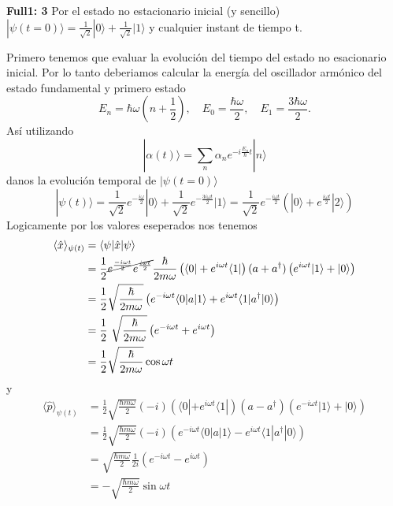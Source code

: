 \begin{ejercicio}
\textbf{Full1: 3} 
Por el estado no estacionario inicial (y sencillo) $|\psi(t=0)\rangle =
\frac{1}{\sqrt{2}} |0\rangle + \frac{1}{\sqrt{2}} | 1 \rangle$ y cualquier
instant de tiempo t. 
\end{ejercicio}
\begin{solucion}
Primero tenemos que evaluar la evolución del tiempo del estado no esacionario
inicial. Por lo tanto deberiamos calcular la energía del oscillador armónico
del estado fundamental y primero estado
\begin{equation*}
	E_n = \hbar \omega (n + \frac{1}{2}), \quad E_0 = \frac{\hbar \omega}{2}
,\quad E_1 = \frac{3 \hbar \omega}{2}.
\end{equation*}
Así utilizando
\begin{equation*}
	|\alpha (t)\rangle = \sum_n \alpha_n e^{-i\frac{E_n}{\hbar} t} | n\rangle
\end{equation*}
danos la evolución temporal de $|\psi(t=0)\rangle$ 
\begin{equation*}
	|\psi(t)\rangle = \frac{1}{\sqrt{2}} e^{-\frac{i\omega}{2}}|0\rangle
+ \frac{1}{\sqrt{2}} e^{-\frac{3 i \omega t}{2}} |1 \rangle  = \frac{1}{\sqrt{2}}
e^{-\frac{i\omega t}{2}} \left( |0\rangle + e^{\frac{i \omega t}{2}} |
2\rangle \right)
\end{equation*}
Logicamente por los valores eseperados nos tenemos
\begin{align*}
	\langle \hat x \rangle_{\psi(t)} &= \langle \psi | \hat x | \psi \rangle \\
	&= \frac{1}{2} \cancel{e^{\frac{- i \omega t}{2}}e^{\frac{i \omega t}{2}}}
\frac{\hbar}{2m\omega} \left( \langle 0| + e^{i\omega t} \langle 1 | \right) ( a +
a^\dagger) \left( e^{i\omega t} | 1 \rangle + | 0 \rangle \right) \\
	&= \frac{1}{2} \sqrt{\frac{\hbar}{2m\omega}} \left( e^{-i\omega t}\langle 0
| a | 1 \rangle + e^{i\omega t} \langle 1 | a^\dagger | 0 \rangle \right) \\
	&= \frac{1}{2} \sqrt{\frac{\hbar}{2m\omega}} \left( e^{-i\omega t} + e^{i
\omega t} \right) \\
	&= \frac{1}{2} \sqrt{\frac{\hbar}{2m\omega}} \cos{\omega t}  
\end{align*}
y 
\begin{align*}
	\langle \hat p \rangle_{\psi(t)} &= \frac{1}{2} \sqrt{\frac{\hbar m
\omega}{2}} (-i) \left( \langle 0| + e^{i\omega t} \langle 1| \right) (a -
a^\dagger) \left( e^{-i\omega t} |1\rangle + |0\rangle \right) \\
	&= \frac{1}{2} \sqrt{\frac{\hbar m \omega}{2}} (-i) \left( e^{-i\omega
t}\langle 0 | a | 1 \rangle - e^{i\omega t} \langle 1| a^\dagger | 0 \rangle
\right) \\
	&= \sqrt{\frac{\hbar m \omega}{2}} \frac{1}{2i}\left( e^{-i\omega t} -
e^{i \omega t} \right) \\
	&= -\sqrt{\frac{\hbar m \omega}{2}} \sin{\omega t}  
\end{align*}
\end{solucion}


